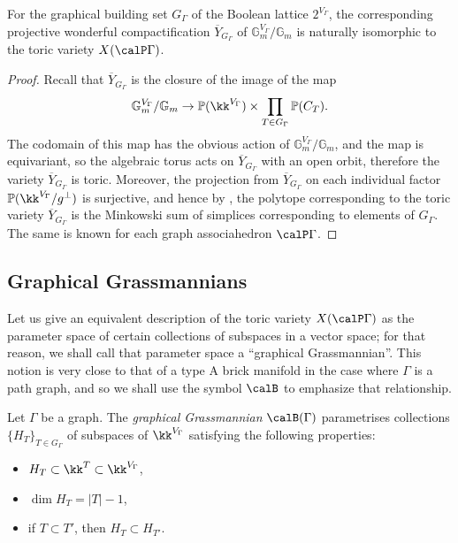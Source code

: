 \begin{prop}\label{prop:wondtoric}
For the graphical building set $G_\Gamma$ of the Boolean lattice $2^{V_\Gamma}$, the corresponding projective wonderful compactification  $\overline{Y}_{G_\Gamma}$ of $\mathbb{G}_m^{V_\Gamma}/\mathbb{G}_m$ is naturally isomorphic to the toric variety $X(\calP\Gamma)$.
\end{prop}

\begin{proof}
Recall that $\overline{Y}_{G_\Gamma}$ is the closure of the image of the map
 \[
\mathbb{G}_m^{V_\Gamma}/\mathbb{G}_m\to\mathbb{P}(\kk^{V_\Gamma})\times\prod_{T\in G_\Gamma} \mathbb{P}(C_T).
 \]
The codomain of this map has the obvious action of $\mathbb{G}_m^{V_\Gamma}/\mathbb{G}_m$, and the map is equivariant, so the algebraic torus acts on $\overline{Y}_{G_\Gamma}$ with an open orbit, therefore the variety $\overline{Y}_{G_\Gamma}$ is toric. Moreover, the projection from $\overline{Y}_{G_\Gamma}$ on each individual factor $\mathbb{P}(\kk^{V_\Gamma}/g^\bot)$ is surjective, and hence by \cite[Prop.~8.1.4]{MR2394437}, the polytope corresponding to the toric variety $\overline{Y}_{G_\Gamma}$ is the Minkowski sum of simplices corresponding to elements of $G_\Gamma$. The same is known \cite{MR2487491} for each graph associahedron $\calP\Gamma$. 
\end{proof}

\subsection{Graphical Grassmannians}

Let us give an equivalent description of the toric variety $X(\calP\Gamma)$ as the parameter space of certain collections of subspaces in a vector space; for that reason, we shall call that parameter space a ``graphical Grassmannian''. This notion is very close to that of a type A brick manifold \cite{MR4072173,MR3512647} in the case where $\Gamma$ is a path graph, and so we shall use the symbol $\calB$ to emphasize that relationship.

\begin{defi}
Let $\Gamma$ be a graph. The \emph{graphical Grassmannian} $\calB(\Gamma)$ parametrises collections $\{H_T\}_{T\in G_\Gamma}$ of subspaces of $\kk^{V_\Gamma}$ satisfying the following properties:
\begin{itemize}
\item $H_T\subset \kk^{T}\subset \kk^{V_\Gamma}$,
\item $\dim H_T=|T|-1$,
\item if $T\subset T'$, then $H_T\subset H_{T'}$.
\end{itemize}
\end{defi}

